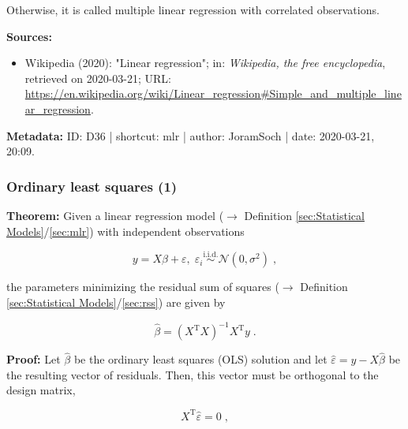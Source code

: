 \documentclass[a4paper,12pt,twoside]{book}
\begin{document}
Otherwise, it is called multiple linear regression with correlated observations.


\vspace{1em}
\textbf{Sources:}
\begin{itemize}
\item Wikipedia (2020): "Linear regression"; in: \textit{Wikipedia, the free encyclopedia}, retrieved on 2020-03-21; URL: \url{https://en.wikipedia.org/wiki/Linear_regression#Simple_and_multiple_linear_regression}.
\end{itemize}


\vspace{1em}
\textbf{Metadata:} ID: D36 | shortcut: mlr | author: JoramSoch | date: 2020-03-21, 20:09.
\vspace{1em}



\subsubsection[\textbf{Ordinary least squares (1)}]{Ordinary least squares (1)} \label{sec:mlr-ols}
\setcounter{equation}{0}

\textbf{Theorem:} Given a linear regression model ($\rightarrow$ Definition \ref{sec:Statistical Models}/\ref{sec:mlr}) with independent observations

\begin{equation} \label{eq:mlr-ols-MLR}
y = X\beta + \varepsilon, \; \varepsilon_i \overset{\mathrm{i.i.d.}}{\sim} \mathcal{N}(0, \sigma^2) \; ,
\end{equation}

the parameters minimizing the residual sum of squares ($\rightarrow$ Definition \ref{sec:Statistical Models}/\ref{sec:rss}) are given by

\begin{equation} \label{eq:mlr-ols-OLS}
\hat{\beta} = (X^\mathrm{T} X)^{-1} X^\mathrm{T} y \; .
\end{equation}


\vspace{1em}
\textbf{Proof:} Let $\hat{\beta}$ be the ordinary least squares (OLS) solution and let $\hat{\varepsilon} = y - X\hat{\beta}$ be the resulting vector of residuals. Then, this vector must be orthogonal to the design matrix,

\begin{equation} \label{eq:mlr-ols-X-e-orth}
X^\mathrm{T} \hat{\varepsilon} = 0 \; ,
\end{equation}
\end{document}
